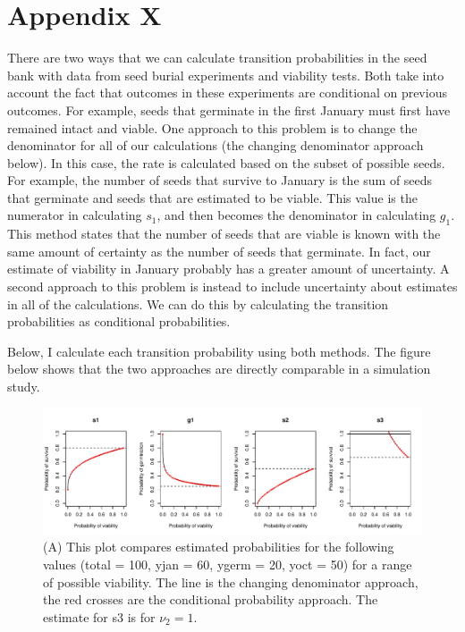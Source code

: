 \documentclass[12pt, oneside]{article}   	%
\begin{document}
\section*{Appendix X}

There are two ways that we can calculate transition probabilities in the seed bank with data from seed burial experiments and viability tests. Both take into account the fact that outcomes in these experiments are conditional on previous outcomes. For example, seeds that germinate in the first January must first have remained intact and viable. One approach to this problem is to change the denominator for all of our calculations (the changing denominator approach below). In this case, the rate is calculated based on the subset of possible seeds. For example, the number of seeds that survive to January is the sum of seeds that germinate and seeds that are estimated to be viable. This value is the numerator in calculating $s_1$, and then becomes the denominator in calculating $g_1$. This method states that the number of seeds that are viable is known with the same amount of certainty as the number of seeds that germinate. In fact, our estimate of viability in January probably has a greater amount of uncertainty. A second approach to this problem is instead to include uncertainty about estimates in all of the calculations. We can do this by calculating the transition probabilities as conditional probabilities. 

Below, I calculate each transition probability using both methods. The figure below shows that the two approaches are directly comparable in a simulation study. 
%
 \begin{figure}[h]
   \centering
       \includegraphics[page=1,width=\textwidth]{../figures/appendix/comparison}  
    \caption{ (A) This plot compares estimated probabilities for the following values (total = 100, yjan = 60, ygerm = 20, yoct = 50) for a range of possible viability. The line is the changing denominator approach, the red crosses are the conditional probability approach. The estimate for s3 is for $\nu_2 = 1$. }
 \label{fig:comparison}
\end{figure}
%
\end{document}
